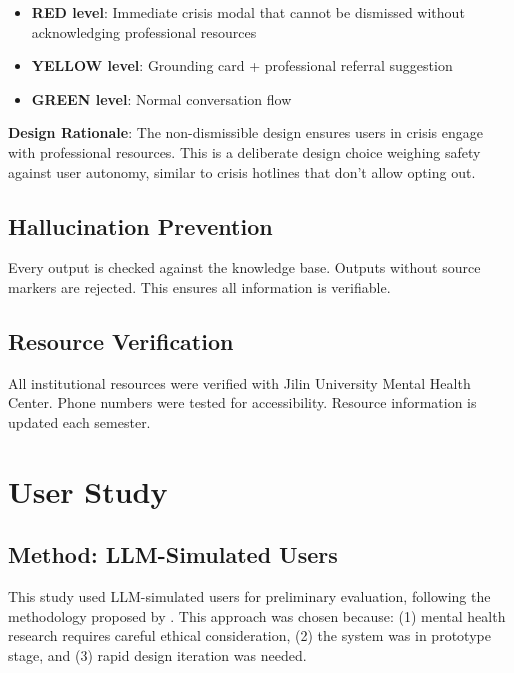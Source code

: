 \documentclass[preprint,12pt]{elsarticle}
\begin{document}
\begin{itemize}
    \item \textbf{RED level}: Immediate crisis modal that cannot be dismissed without
          acknowledging professional resources
    \item \textbf{YELLOW level}: Grounding card + professional referral suggestion
    \item \textbf{GREEN level}: Normal conversation flow
\end{itemize}

\textbf{Design Rationale}: The non-dismissible design ensures users in crisis engage
with professional resources. This is a deliberate design choice weighing safety
against user autonomy, similar to crisis hotlines that don't allow opting out.

\subsection{Hallucination Prevention}

Every output is checked against the knowledge base. Outputs without source
markers are rejected. This ensures all information is verifiable.

\subsection{Resource Verification}

All institutional resources were verified with Jilin University Mental Health Center.
Phone numbers were tested for accessibility. Resource information is updated
each semester.

\section{User Study}

\subsection{Method: LLM-Simulated Users}

This study used LLM-simulated users for preliminary evaluation, following the
methodology proposed by \citet{horton2023llm}. This approach was chosen because:
(1) mental health research requires careful ethical consideration,
(2) the system was in prototype stage, and
(3) rapid design iteration was needed.
\end{document}
